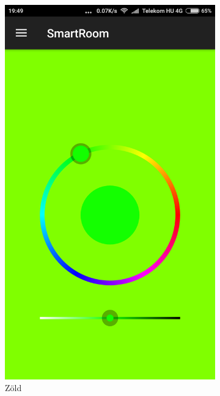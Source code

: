 \documentclass[12pt]{extarticle}
\begin{document}
\begin{figure}[h!]
\begin{subfigure}[b]{0.3\linewidth}
			\includegraphics[width=\linewidth]{zold2.png}
			\caption{Zöld}
		\end{subfigure}
		\begin{subfigure}[b]{0.3\linewidth}

\end{subfigure}
\end{figure}
\end{document}
